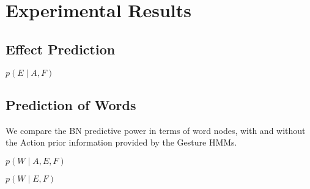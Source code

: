 
\section{Experimental Results}




\subsection{Effect Prediction}

$p(E \mid A, F)$

\subsection{Prediction of Words}

We compare the \ac{BN} predictive power in terms of word nodes, with and without the Action prior information provided by the Gesture \acp{HMM}.

$p(W \mid A, E, F)$

$p(W \mid E, F)$
